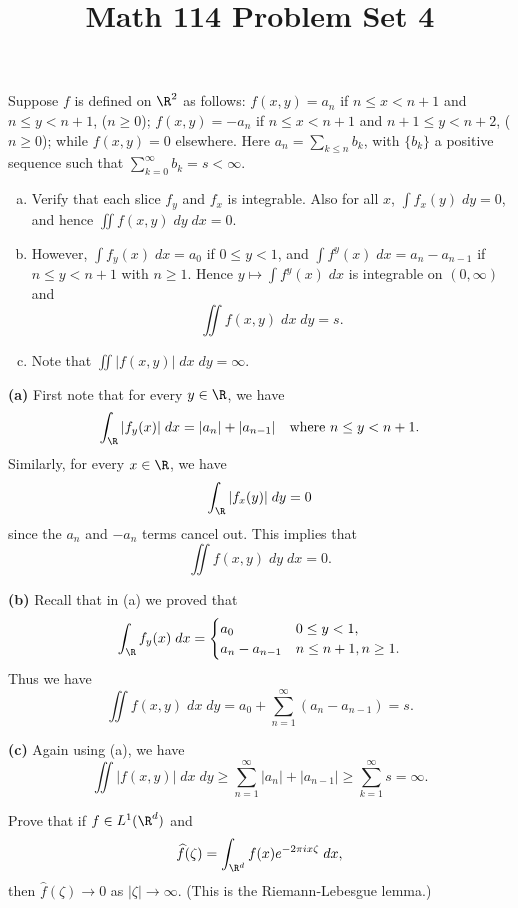\documentclass[11pt,letterpaper]{article}
\title{\textbf{Math 114 Problem Set 4}}
\begin{document}
\maketitle

\begin{cproblem}{17} Suppose $f$ is defined on $\R^2$ as follows: $f(x,y)=a_n$ if $n\leq x<n+1$ and $n\leq y<n+1$, ($n\geq 0$); $f(x,y)=-a_n$ if $n\leq x<n+1$ and $n+1\leq y <n+2$, ($n\geq 0$); while $f(x,y)=0$ elsewhere. Here $a_n=\sum_{k\leq n}b_k$, with $\{b_k\}$ a positive sequence such that $\sum^\infty_{k=0}b_k=s<\infty$.
    \begin{enumerate}[(a)]
        \item Verify that each slice $f_y$ and $f_x$ is integrable. Also for all $x$, $\int f_x(y)\;dy=0$, and hence $\iint f(x,y)\;dy\;dx=0$.
        \item However, $\int f_y(x)\;dx = a_0$ if $0\leq y<1$, and $\int f^y(x)\;dx=a_n - a_{n-1}$ if $n\leq y<n+1$ with $n\geq 1$. Hence $y \mapsto \int f^y(x)\;dx$ is integrable on $(0,\infty)$ and 
        \[
            \iint f(x,y)\;dx\;dy = s    
        .\]   
        \item Note that $\iint|f(x,y)|\;dx\;dy = \infty$.
    \end{enumerate}  
\end{cproblem}

\begin{solution}
    \textbf{(a)} First note that for every $y\in \R$, we have
    \[
        \int_\R |f_y(x)|\;dx = |a_n|+|a_{n-1}| \quad \text{where }n\leq y<n+1
    .\] 
    Similarly, for every $x\in \R$, we have
    \[
        \int_\R |f_x(y)|\;dy = 0
    \]
    since the $a_n$ and $-a_n$ terms cancel out. This implies that
    \[
        \iint f(x,y)\;dy\;dx = 0
    .\]   
    
    \textbf{(b)} Recall that in (a) we proved that
    \[
        \int_\R f_y(x)\;dx=\begin{cases}
            a_0&0\leq y<1,\\
            a_n-a_{n-1}&n\leq n+1, n\geq 1.
        \end{cases}
    \]
    Thus we have
    \[
        \iint f(x,y)\;dx\;dy = a_0 +\sum^\infty_{n=1}(a_n - a_{n-1}) = s.
    \]  

    \textbf{(c)} Again using (a), we have
    \[
        \iint |f(x,y)|\;dx\;dy \geq \sum_{n=1}^\infty |a_n|+|a_{n-1}| \geq \sum^\infty_{k=1} s = \infty
    .\] 
\end{solution}

\begin{cproblem}{22} Prove that if $f\in L^1(\R^d)$ and
    \[
        \widehat{f}(\zeta) = \int_{\R^d} f(x)e^{-2\pi i x \zeta}\;dx,
    \] 
    then $\widehat{f}(\zeta)\to 0$ as $|\zeta|\to \infty$. (This is the Riemann-Lebesgue lemma.)
\end{cproblem}
\end{document}
